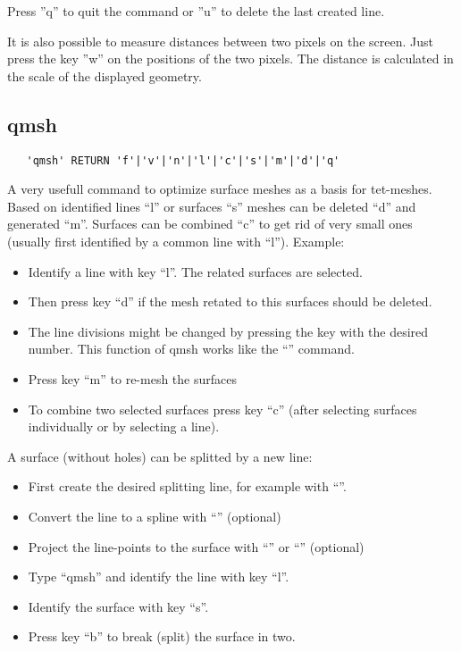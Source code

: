 \documentclass{article}
\begin{document}
Press ''q'' to quit the command or ''u'' to delete the last created line.

It is also possible to measure distances between two pixels on the screen. Just press the key ''w'' on the positions of the two pixels. The distance is calculated in the scale of the displayed geometry.

\subsection{\label{qmsh}qmsh}
\begin{verbatim}
   'qmsh' RETURN 'f'|'v'|'n'|'l'|'c'|'s'|'m'|'d'|'q'
\end{verbatim}
A very usefull command to optimize surface meshes as a basis for tet-meshes. Based on identified lines ``l'' or surfaces ``s'' meshes can be deleted ``d'' and generated ``m''. Surfaces can be combined ``c'' to get rid of very small ones (usually first identified by a common line with ``l''). Example:
\begin{itemize}
\item Identify a line with key ``l''. The related surfaces are selected.
\item Then press key ``d'' if the mesh retated to this surfaces should be deleted.
\item The line divisions might be changed by pressing the key with the desired number. This function of qmsh works like the ``'' command.
\item Press key ``m'' to re-mesh the surfaces
\item To combine two selected surfaces press key ``c'' (after selecting surfaces individually or by selecting a line).
\end{itemize}
A surface (without holes) can be splitted by a new line:
\begin{itemize}
\item First create the desired splitting line, for example with ``''.
\item Convert the line to a spline with ``'' (optional)
\item Project the line-points to the surface with ``'' or ``'' (optional)
\item Type ``qmsh'' and identify the line with key ``l''.
\item Identify the surface with key ``s''.
\item Press key ``b'' to break (split) the surface in two.
\end{itemize}
\end{document}
